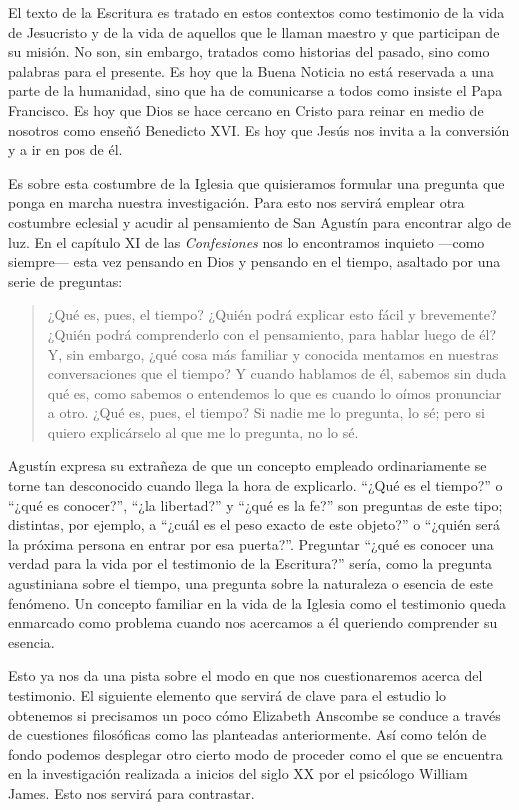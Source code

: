 El texto de la Escritura es tratado en estos contextos como testimonio de la
vida de Jesucristo y de la vida de aquellos que le llaman maestro y que
participan de su misión. No son, sin embargo, tratados como historias del
pasado, sino como palabras para el presente. Es hoy que la Buena Noticia no está
reservada a una parte de la humanidad, sino que ha de comunicarse a todos como
insiste el Papa Francisco. Es hoy que Dios se hace cercano en Cristo para reinar
en medio de nosotros como enseñó Benedicto XVI. Es hoy que Jesús nos invita a la
conversión y a ir en pos de él.

Es sobre esta costumbre de la Iglesia que quisieramos formular una pregunta que
ponga en marcha nuestra investigación. Para esto nos servirá emplear otra
costumbre eclesial y acudir al pensamiento de San Agustín para encontrar algo de
luz. En el capítulo XI de las \emph{Confesiones} nos lo encontramos inquieto
---como siempre--- esta vez pensando en Dios y pensando en el tiempo, asaltado
por una serie de preguntas:

\blockquote[{\cite[XI.14 n.17]{confesiones}}]{¿Qué es, pues, el tiempo? ¿Quién
  podrá explicar esto fácil y brevemente? ¿Quién podrá comprenderlo con el
  pensamiento, para hablar luego de él? Y, sin embargo, ¿qué cosa más familiar y
  conocida mentamos en nuestras conversaciones que el tiempo? Y cuando hablamos
  de él, sabemos sin duda qué es, como sabemos o entendemos lo que es cuando lo
  oímos pronunciar a otro. ¿Qué es, pues, el tiempo? Si nadie me lo pregunta, lo
  sé; pero si quiero explicárselo al que me lo pregunta, no lo sé.}

Agustín expresa su extrañeza de que un concepto empleado ordinariamente se torne
tan desconocido cuando llega la hora de explicarlo. \enquote{¿Qué es el tiempo?}
o \enquote{¿qué es conocer?}, \enquote{¿la libertad?} y \enquote{¿qué es la fe?}
son preguntas de este tipo; distintas, por ejemplo, a \enquote{¿cuál es el peso
  exacto de este objeto?} o \enquote{¿quién será la próxima persona en entrar
  por esa puerta?}.\autocite[Cf.~][304]{wittgenstein2005bt} Preguntar
\enquote{¿qué es conocer una verdad para la vida por el testimonio de la
  Escritura?} sería, como la pregunta agustiniana sobre el tiempo, una pregunta
sobre la naturaleza o esencia de este fenómeno. Un concepto familiar en la vida
de la Iglesia como el testimonio queda enmarcado como problema cuando nos
acercamos a él queriendo comprender su esencia.

Esto ya nos da una pista sobre el modo en que nos cuestionaremos acerca del
testimonio. El siguiente elemento que servirá de clave para el estudio lo
obtenemos si precisamos un poco cómo Elizabeth Anscombe se conduce a través de
cuestiones filosóficas como las planteadas anteriormente. Así como telón de
fondo podemos desplegar otro cierto modo de proceder como el que se encuentra en
la investigación realizada a inicios del siglo XX por el psicólogo William
James. Esto nos servirá para contrastar.

